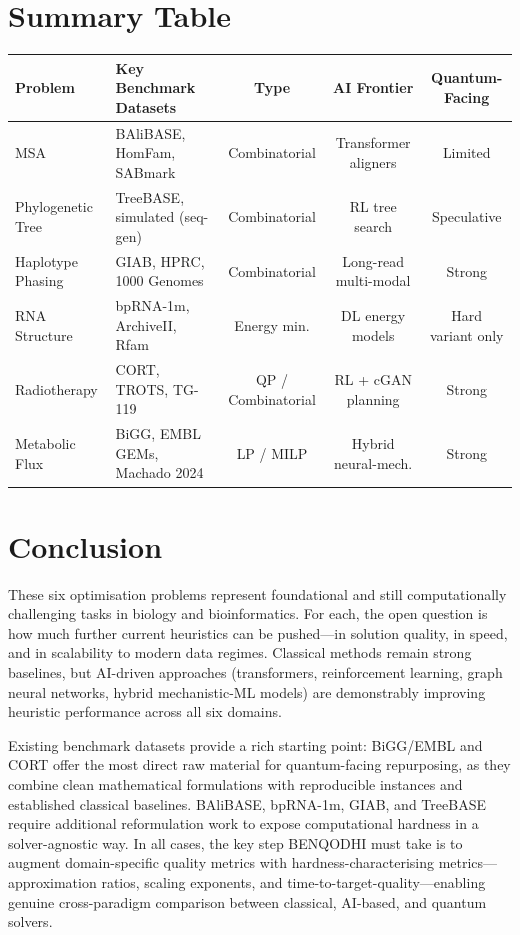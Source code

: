 \documentclass[11pt]{article}
\begin{document}
\newpage

\section*{Summary Table}

\begin{center}
\begin{tabular}{llccc}
\toprule
Problem & Key Benchmark Datasets & Type & AI Frontier & Quantum-Facing \\
\midrule
MSA & BAliBASE, HomFam, SABmark & Combinatorial & Transformer aligners & Limited \\
Phylogenetic Tree & TreeBASE, simulated (seq-gen) & Combinatorial & RL tree search & Speculative \\
Haplotype Phasing & GIAB, HPRC, 1000 Genomes & Combinatorial & Long-read multi-modal & Strong \\
RNA Structure & bpRNA-1m, ArchiveII, Rfam & Energy min. & DL energy models & Hard variant only \\
Radiotherapy & CORT, TROTS, TG-119 & QP / Combinatorial & RL + cGAN planning & Strong \\
Metabolic Flux & BiGG, EMBL GEMs, Machado 2024 & LP / MILP & Hybrid neural-mech. & Strong \\
\bottomrule
\end{tabular}
\end{center}

\section*{Conclusion}

These six optimisation problems represent foundational and still computationally
challenging tasks in biology and bioinformatics. For each, the open question is
how much further current heuristics can be pushed---in solution quality, in speed,
and in scalability to modern data regimes.
Classical methods remain strong baselines, but AI-driven approaches (transformers, 
reinforcement learning, graph neural networks, hybrid mechanistic-ML models) are 
demonstrably improving heuristic performance across all six domains. 

Existing benchmark datasets provide a rich starting point: BiGG/EMBL and CORT offer
the most direct raw material for quantum-facing repurposing, as they combine clean
mathematical formulations with reproducible instances and established classical baselines.
BAliBASE, bpRNA-1m, GIAB, and TreeBASE require additional reformulation work to
expose computational hardness in a solver-agnostic way. In all cases, the key step
BENQODHI must take is to augment domain-specific quality metrics with hardness-characterising
metrics---approximation ratios, scaling exponents, and time-to-target-quality---enabling
genuine cross-paradigm comparison between classical, AI-based, and quantum solvers.


\end{document}
